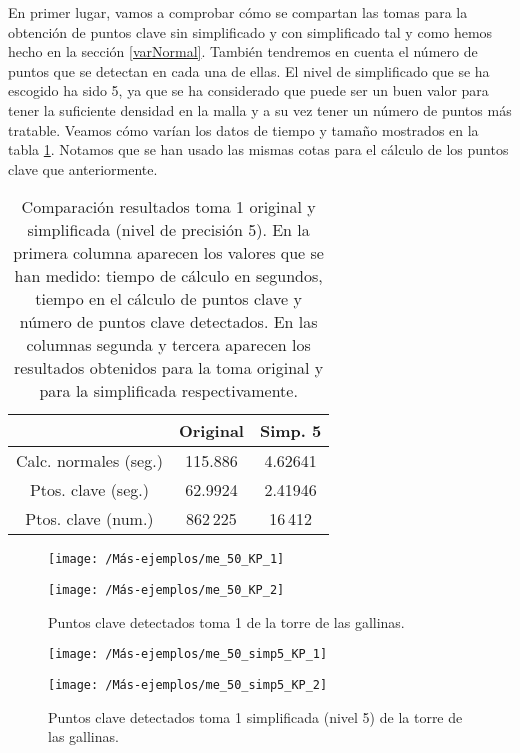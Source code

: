 En primer lugar, vamos a comprobar cómo se compartan las tomas para la obtención de puntos clave sin simplificado y con simplificado tal y como hemos hecho en la sección \ref{varNormal}. También tendremos en cuenta el número de puntos que se detectan en cada una de ellas. El nivel de simplificado que se ha escogido ha sido 5, ya que se ha considerado que puede ser un buen valor para tener la suficiente densidad en la malla y a su vez tener un número de puntos más tratable. Veamos cómo varían los datos de tiempo y tamaño mostrados en la tabla \ref{table:me-normal}. Notamos que se han usado las mismas cotas para el cálculo de los puntos clave que anteriormente.\\

\begin{table}[h!]
	\centering
	\begin{tabular}{| c | c | c |} 
		\hline
		& Original  & Simp. 5 \\
		\hline
		Calc. normales (seg.) & 115.886  &  4.62641\\			 
		Ptos. clave (seg.) & 62.9924 & 2.41946\\
		Ptos. clave (num.) & 862\,225 & 16\,412\\
		\hline
	\end{tabular}
	\caption{Comparación resultados toma 1 original y simplificada (nivel de precisión 5). En la primera columna aparecen los valores que se han medido: tiempo de cálculo en segundos, tiempo en el cálculo de puntos clave y número de puntos clave detectados. En las columnas segunda y tercera aparecen los resultados obtenidos para la toma original y para la simplificada respectivamente.}
	\label{table:me-normal}
\end{table}


\begin{figure}[h!]	
	\begin{minipage}[b]{0.5\textwidth}
		\centering		
		\texttt{[image: /Más-ejemplos/me\_50\_KP\_1]} 
	\end{minipage}
	\begin{minipage}[b]{0.5\textwidth}
		\centering
		\texttt{[image: /Más-ejemplos/me\_50\_KP\_2]}
	\end{minipage}
	\caption{Puntos clave detectados toma 1 de la torre de las gallinas.}
	\label{me_50_KP}
\end{figure}
\begin{figure}[h!]	
	\begin{minipage}{0.5\textwidth}
		\centering		
		\texttt{[image: /Más-ejemplos/me\_50\_simp5\_KP\_1]} 
	\end{minipage}
	\begin{minipage}{0.5\textwidth}
		\centering
		\texttt{[image: /Más-ejemplos/me\_50\_simp5\_KP\_2]}
	\end{minipage}
	\caption{Puntos clave detectados toma 1 simplificada (nivel 5) de la torre de las gallinas.}
	\label{me_50_KP_simp4}
\end{figure}

